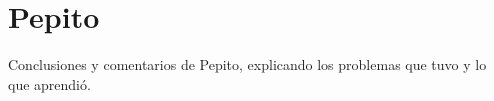 \section{Pepito}
Conclusiones y comentarios de Pepito, explicando los problemas que tuvo y lo que aprendió.